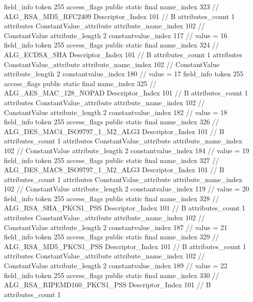 {{{{{{{				}
				}
			}
			field_info {
				token	255
				access_flags	public static final
				name_index	323		// ALG_RSA_MD5_RFC2409
				Descriptor_Index	101		// B
				attributes_count	1
				attributes {
				ConstantValue_attribute {
					attribute_name_index	102		// ConstantValue
					attribute_length	2
					constantvalue_index	117		// value = 16
				}
				}
			}
			field_info {
				token	255
				access_flags	public static final
				name_index	324		// ALG_ECDSA_SHA
				Descriptor_Index	101		// B
				attributes_count	1
				attributes {
				ConstantValue_attribute {
					attribute_name_index	102		// ConstantValue
					attribute_length	2
					constantvalue_index	180		// value = 17
				}
				}
			}
			field_info {
				token	255
				access_flags	public static final
				name_index	325		// ALG_AES_MAC_128_NOPAD
				Descriptor_Index	101		// B
				attributes_count	1
				attributes {
				ConstantValue_attribute {
					attribute_name_index	102		// ConstantValue
					attribute_length	2
					constantvalue_index	182		// value = 18
				}
				}
			}
			field_info {
				token	255
				access_flags	public static final
				name_index	326		// ALG_DES_MAC4_ISO9797_1_M2_ALG3
				Descriptor_Index	101		// B
				attributes_count	1
				attributes {
				ConstantValue_attribute {
					attribute_name_index	102		// ConstantValue
					attribute_length	2
					constantvalue_index	184		// value = 19
				}
				}
			}
			field_info {
				token	255
				access_flags	public static final
				name_index	327		// ALG_DES_MAC8_ISO9797_1_M2_ALG3
				Descriptor_Index	101		// B
				attributes_count	1
				attributes {
				ConstantValue_attribute {
					attribute_name_index	102		// ConstantValue
					attribute_length	2
					constantvalue_index	119		// value = 20
				}
				}
			}
			field_info {
				token	255
				access_flags	public static final
				name_index	328		// ALG_RSA_SHA_PKCS1_PSS
				Descriptor_Index	101		// B
				attributes_count	1
				attributes {
				ConstantValue_attribute {
					attribute_name_index	102		// ConstantValue
					attribute_length	2
					constantvalue_index	187		// value = 21
				}
				}
			}
			field_info {
				token	255
				access_flags	public static final
				name_index	329		// ALG_RSA_MD5_PKCS1_PSS
				Descriptor_Index	101		// B
				attributes_count	1
				attributes {
				ConstantValue_attribute {
					attribute_name_index	102		// ConstantValue
					attribute_length	2
					constantvalue_index	189		// value = 22
				}
				}
			}
			field_info {
				token	255
				access_flags	public static final
				name_index	330		// ALG_RSA_RIPEMD160_PKCS1_PSS
				Descriptor_Index	101		// B
				attributes_count	1
}}}}}
